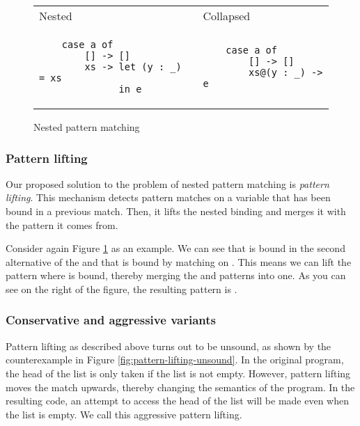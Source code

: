 \begin{figure}
\centering
\begin{tabular}{ >{\centering\arraybackslash}m{17em} >{\centering\arraybackslash}m{13em} }
    Nested & Collapsed \\
    \begin{verbatim}
    case a of
        [] -> []
        xs -> let (y : _) = xs
              in e
    \end{verbatim}
    &
    \begin{verbatim}
    case a of
        [] -> []
        xs@(y : _) -> e
    \end{verbatim}
\end{tabular}
\caption{Nested pattern matching}
\label{fig:patterns-nested-matching}
\end{figure}

\subsubsection{Pattern lifting}

Our proposed solution to the problem of nested pattern matching is \emph{pattern lifting}. This mechanism detects pattern matches on a variable that has been bound in a previous match. Then, it lifts the nested binding and merges it with the pattern it comes from.

Consider again Figure \ref{fig:patterns-nested-matching} as an example. We can see that  is bound in the second alternative of the  and that  is bound by matching on . This means we can lift the pattern where  is bound, thereby merging the  and  patterns into one. As you can see on the right of the figure, the resulting pattern is .


\subsubsection{Conservative and aggressive variants}

Pattern lifting as described above turns out to be unsound, as shown by the counterexample in Figure \ref{fig:pattern-lifting-unsound}. In the original program, the head of the list is only taken if the list is not empty. However, pattern lifting moves the match upwards, thereby changing the semantics of the program. In the resulting code, an attempt to access the head of the list will be made even when the list is empty. We call this aggressive pattern lifting.

